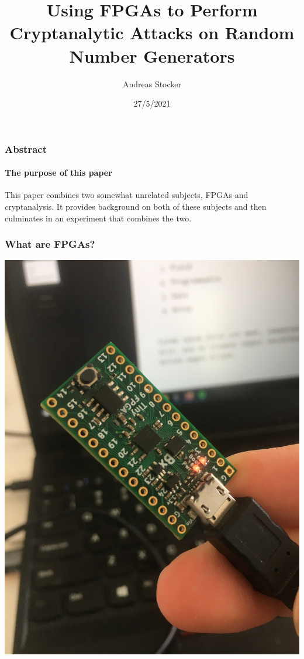 \documentclass{beamer}
\title{Using FPGAs to Perform Cryptanalytic Attacks on Random Number Generators}
\subtitle{}
\date{27/5/2021}
\author{Andreas Stocker}
\institute{University of Nicosia\par\email{andreas@stockers.org}}
\begin{document}
  \frame[plain]{\titlepage}
  

  \begin{frame}
    \frametitle{Abstract}
    \framesubtitle{The purpose of this paper}

    This paper combines two somewhat unrelated subjects, FPGAs and cryptanalysis.
    It provides background on both of these subjects and then culminates
    in an experiment that combines the two.
  \end{frame}


  \begin{frame}
    \frametitle{What are FPGAs?}


    \begin{multicols}{2}

    \includegraphics[scale=0.15,angle=-90]{tinyfpga-bx}
    
    \vfill
    
    \vspace*{\fill}
    

\end{multicols}
\end{frame}
\end{document}
